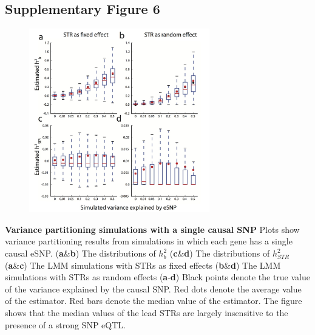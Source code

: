\subsection{Supplementary Figure 6}
\begin{figure}[h!]
\centering
\label{fig:estrsupfig6}
\includegraphics[width=0.7\textwidth]{Figures/Chapter4/SuppFig6.jpg}
\end{figure}
\textbf{Variance partitioning simulations with a single causal SNP} Plots show variance partitioning results from simulations in which each gene has a single causal eSNP.
(\textbf{a}\&\textbf{b}) The distributions of $h^2_{b}$
(\textbf{c}\&\textbf{d}) The distributions of $h^2_{STR}$
(\textbf{a}\&\textbf{c}) The LMM simulations with STRs as fixed effects
(\textbf{b}\&\textbf{d}) The LMM simulations with STRs as random effects
(\textbf{a}-\textbf{d}) Black points denote the true value of the variance explained by the causal SNP. 
Red dots denote the average value of the estimator.
Red bars denote the median value of the estimator.
The figure shows that the median values of the lead STRs are largely insensitive to the presence of a strong SNP eQTL.

\pagebreak
